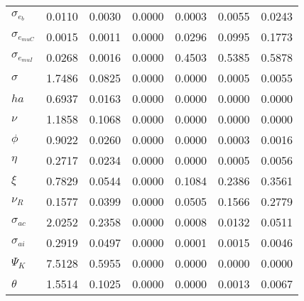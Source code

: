 \begin{center}
\begin{longtable}{lcccccc}
$ \sigma_{{e_b}}       $	 & 	          0.0110	 & 	          0.0030	 & 	          0.0000	 & 	          0.0003	 & 	          0.0055	 & 	          0.0243 \\ 
$ \sigma_{{e_{muC}}}   $	 & 	          0.0015	 & 	          0.0011	 & 	          0.0000	 & 	          0.0296	 & 	          0.0995	 & 	          0.1773 \\ 
$ \sigma_{{e_{muI}}}   $	 & 	          0.0268	 & 	          0.0016	 & 	          0.0000	 & 	          0.4503	 & 	          0.5385	 & 	          0.5878 \\ 
$ {\sigma}             $	 & 	          1.7486	 & 	          0.0825	 & 	          0.0000	 & 	          0.0000	 & 	          0.0005	 & 	          0.0055 \\ 
$ {ha}                 $	 & 	          0.6937	 & 	          0.0163	 & 	          0.0000	 & 	          0.0000	 & 	          0.0000	 & 	          0.0000 \\ 
$ \nu                  $	 & 	          1.1858	 & 	          0.1068	 & 	          0.0000	 & 	          0.0000	 & 	          0.0000	 & 	          0.0000 \\ 
$ {\phi}               $	 & 	          0.9022	 & 	          0.0260	 & 	          0.0000	 & 	          0.0000	 & 	          0.0003	 & 	          0.0016 \\ 
$ {\eta}               $	 & 	          0.2717	 & 	          0.0234	 & 	          0.0000	 & 	          0.0000	 & 	          0.0005	 & 	          0.0056 \\ 
$ \xi                  $	 & 	          0.7829	 & 	          0.0544	 & 	          0.0000	 & 	          0.1084	 & 	          0.2386	 & 	          0.3561 \\ 
$ {\nu_R}              $	 & 	          0.1577	 & 	          0.0399	 & 	          0.0000	 & 	          0.0505	 & 	          0.1566	 & 	          0.2779 \\ 
$ {\sigma_{ac}}        $	 & 	          2.0252	 & 	          0.2358	 & 	          0.0000	 & 	          0.0008	 & 	          0.0132	 & 	          0.0511 \\ 
$ {\sigma_{ai}}        $	 & 	          0.2919	 & 	          0.0497	 & 	          0.0000	 & 	          0.0001	 & 	          0.0015	 & 	          0.0046 \\ 
$ {\Psi_{K}}           $	 & 	          7.5128	 & 	          0.5955	 & 	          0.0000	 & 	          0.0000	 & 	          0.0000	 & 	          0.0000 \\ 
$ {\theta}             $	 & 	          1.5514	 & 	          0.1025	 & 	          0.0000	 & 	          0.0000	 & 	          0.0013	 & 	          0.0067 \\ 

\end{longtable}
\end{center}
